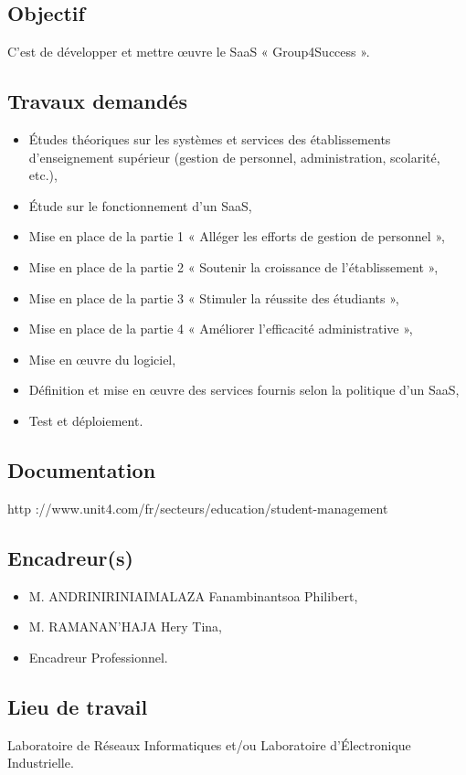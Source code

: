 \documentclass[11pt]{article}
\begin{document}
	
	\subsection*{Objectif}
	C'est de développer et mettre œuvre le SaaS « Group4Success ».
	
	\subsection*{Travaux demandés}
		\begin{itemize}
			\item Études théoriques sur les systèmes et services des établissements d'enseignement supérieur (gestion de personnel, administration, scolarité, etc.),
			\item Étude sur le fonctionnement d'un SaaS,
			\item Mise en place de la partie 1 « Alléger les efforts de gestion de personnel »,
			\item Mise en place de la partie 2 « Soutenir la croissance de l'établissement »,
			\item Mise en place de la partie 3 « Stimuler la réussite des étudiants »,
			\item Mise en place de la partie 4 « Améliorer l'efficacité administrative »,
			\item Mise en œuvre du logiciel,
			\item Définition et mise en œuvre des services fournis selon la politique d'un SaaS,
			\item Test et déploiement.
		\end{itemize}

	\subsection*{Documentation}
		http ://www.unit4.com/fr/secteurs/education/student-management
		
	\subsection*{Encadreur(s)}
		\begin{itemize}
			\item M. ANDRINIRINIAIMALAZA Fanambinantsoa Philibert,
			\item M. RAMANAN'HAJA Hery Tina,
			\item Encadreur Professionnel.
		\end{itemize}
	
	\subsection*{Lieu de travail}
	Laboratoire de Réseaux Informatiques et/ou Laboratoire d'Électronique Industrielle.
\end{document}
